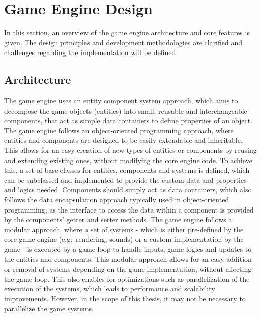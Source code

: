 \section{Game Engine Design}\label{sec:game-engine-design}
In this section, an overview of the game engine architecture and core features is given.
The design principles and development methodologies are clarified and challenges regarding the implementation will be defined.

\subsection{Architecture}\label{subsec:architecture}
The game engine uses an entity component system approach, which aims to decompose the game objects (entities) into small, reusable and interchangeable
components, that act as simple data containers to define properties of an object.
The game engine follows an object-oriented programming approach, where entities and components are designed to be easily extendable and inheritable.
This allows for an easy creation of new types of entities or components by reusing and extending existing ones, without modifying the core engine code.
To achieve this, a set of base classes for entities, components and systems is defined, which can be subclassed and implemented to provide the custom data and
properties and logics needed.
Components should simply act as data containers, which also follows the data encapsulation approach typically used in object-oriented programming, as
the interface to access the data within a component is provided by the components' getter and setter methods.
The game engine follows a modular approach, where a set of systems - which is either pre-defined by the core game engine (e.g.\ rendering, sounds) or
a custom implementation by the game - is executed by a game loop to handle inputs, game logics and updates to the entities and components.
This modular approach allows for an easy addition or removal of systems depending on the game implementation, without affecting the game loop.
This also enables for optimizations such as parallelization of the execution of the systems, which leads to performance and scalability improvements.
However, in the scope of this thesis, it may not be necessary to parallelize the game systems.

